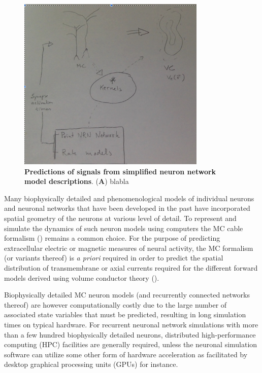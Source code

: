 \begin{figure}[!ht]
\begin{center}
\includegraphics[width=0.8\textwidth]{Figures/Ch-LFPy/Ch-LFPy-geirsketch}
\end{center}
\caption{\textbf{Predictions of signals from simplified neuron network model descriptions}.
({\bf A}) blabla
}
\label{fig:LFPy_circuits}
\end{figure}


Many biophysically detailed and phenomenological models of individual neurons and neuronal networks that have been developed in the past have incorporated spatial geometry of the neurons at various level of detail.
To represent and simulate the dynamics of such neuron models using computers the MC cable formalism () remains a common choice.
For the purpose of predicting extracellular electric or magnetic measures of neural activity,
the MC formalism (or variants thereof) is \emph{a priori} required in order to predict the spatial distribution of transmembrane or axial currents required for the different forward models derived using volume conductor theory ().

Biophysically detailed MC neuron models (and recurrently connected networks thereof) are however computationally costly due to the large number of associated state variables that must be predicted,
resulting in long simulation times on typical hardware.
For recurrent neuronal network simulations with more than a few hundred biophysically detailed neurons, distributed high-performance computing (HPC) facilities are generally required,
unless the neuronal simulation software can utilize some other form of hardware acceleration as facilitated by desktop graphical processing units (GPUs) for instance.

